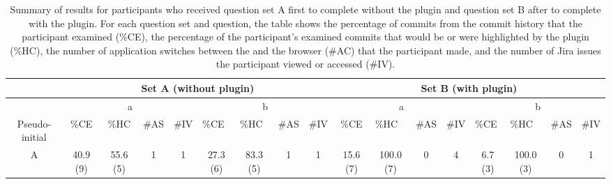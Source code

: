 \begin{landscape}
  \begin{table}
    \footnotesize
    \caption{
      Summary of results for participants who received question set A first to complete without the plugin and question set B after to complete with the plugin.
      For each question set and question, the table shows the percentage of commits from the commit history that the participant examined (\%CE), 
      the percentage of the participant's examined commits that would be or were highlighted by the plugin (\%HC),
      the number of application switches between the  and the browser (\#AC) that the participant made,
      and the number of Jira issues the participant viewed or accessed (\#IV).
    }
    \centering
    \begin{tabular}{@{}ccccccccccccccccc@{}}
      \toprule
      \multicolumn{1}{l}{}                & \multicolumn{8}{c}{Set A (without plugin)}                                                                                                                            & \multicolumn{8}{c}{Set B (with plugin)}                                                                                                                                                                 \\ \midrule
      \multicolumn{1}{c|}{}               & \multicolumn{4}{c|}{a}                                   & \multicolumn{4}{c|}{b}                                                                                     & \multicolumn{4}{c|}{a}                                                                      & \multicolumn{4}{c}{b}                                                                                     \\ \midrule
      \multicolumn{1}{c|}{Pseudo-initial} & \%CE      & \%HC      & \#AS & \multicolumn{1}{l|}{\#IV} & \multicolumn{1}{l}{\%CE} & \multicolumn{1}{l}{\%HC} & \multicolumn{1}{l}{\#AS} & \multicolumn{1}{l|}{\#IV} & \%CE      & \multicolumn{1}{l}{\%HC} & \multicolumn{1}{l}{\#AS} & \multicolumn{1}{l|}{\#IV} & \multicolumn{1}{l}{\%CE} & \multicolumn{1}{l}{\%HC} & \multicolumn{1}{l}{\#AS} & \multicolumn{1}{l}{\#IV} \\ \midrule
      \multicolumn{1}{c|}{A}              & 40.9 (9)  & 55.6 (5)  & 1    & \multicolumn{1}{c|}{1}    & 27.3 (6)                 & 83.3 (5)                 & 1                        & \multicolumn{1}{c|}{1}    & 15.6 (7)  & 100.0 (7)                & 0                        & \multicolumn{1}{c|}{4}    & 6.7 (3)                  & 100.0 (3)                & 0                        & 1                        \\

\end{tabular}
\end{table}
\end{landscape}
